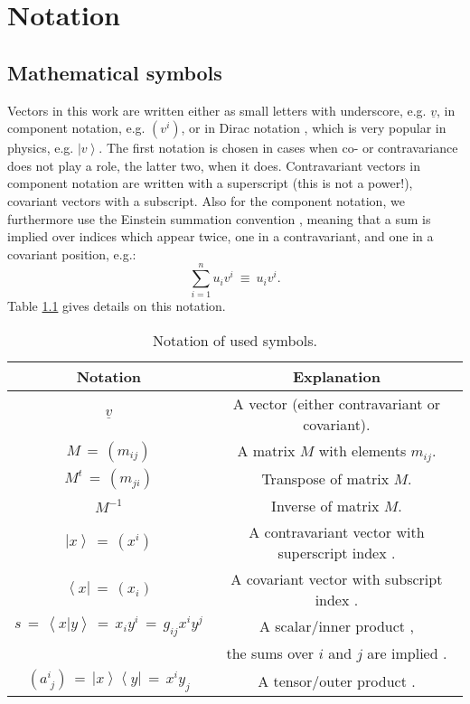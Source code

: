 %
%

\chapter{Notation}
\label{ch:notation}

\section{Mathematical symbols}
Vectors in this work are written either as small letters with underscore, e.g. $\underline{v}$, 
in component notation, e.g. $\left( v^i \right)$, or in Dirac notation \cite{wiki_braket}, which is 
very popular in physics, e.g. $\left| v \right>$. 
The first notation is chosen in cases when co- or contravariance \cite[p. 806]{Arens2015} does not play a role,
the latter two, when it does. 
Contravariant vectors in component notation are written with a superscript (this is not a power!), 
covariant vectors with a subscript.
Also for the component notation, we furthermore use the Einstein summation convention \cite{wiki_summation} \cite[p. 804]{Arens2015},
meaning that a sum is implied over indices which appear twice, one in a contravariant, and one
in a covariant position, e.g.:
\begin{equation}
	\sum_{i=1}^{n} u_i v^i \ \equiv \ u_i v^i.
\end{equation}
Table \ref{tab:notation} gives details on this notation.

\begin{table}[htb]
	\centering
	\begin{tabular}{|c|c|}
		\hline
		\bf{Notation} & \bf{Explanation} \tabularnewline
		\hline
		$ \underline{v} $ & A vector (either contravariant or covariant). \tabularnewline
		\hline
		$ M \,=\, \left( m_{ij} \right) $ & A matrix $M$ with elements $m_{ij}$. \tabularnewline
		\hline
		$ M^t \,=\, \left( m_{ji} \right) $ & Transpose of matrix $M$. \tabularnewline
		\hline
		$ M^{-1} $ & Inverse of matrix $M$. \tabularnewline
		\hline
		$\left| x \right> \,=\, \left( x^i \right) $ & A contravariant vector with superscript index \cite[pp. 806]{Arens2015}. \tabularnewline
		\hline
		$\left< x \right| \,=\, \left( x_i \right) $ & A covariant vector with subscript index \cite[pp. 806]{Arens2015}. \tabularnewline
		\hline
		$s \,=\, \left< x | y \right> \,=\, x_i y^i \,=\, g_{ij} x^i y^j $ & A scalar/inner product \cite[pp. 808]{Arens2015}, \tabularnewline
			& the sums over $i$ and $j$ are implied \cite{wiki_summation}. \tabularnewline
		\hline
		$\left(a^{i}_{\;j}\right) \,=\, \left| x \right> \left< y \right| \,=\, x^i y_j$ & A tensor/outer product \cite[pp. 810]{Arens2015}. \tabularnewline
		\hline
	\end{tabular}
	\caption[Symbol notation.]{Notation of used symbols.}
	\label{tab:notation}
\end{table}


